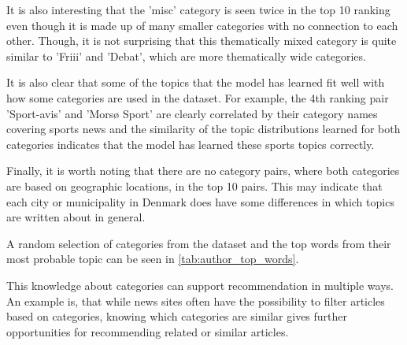 It is also interesting that the 'misc' category is seen twice in the top 10 ranking even though it is made up of many smaller categories with no connection to each other.
Though, it is not surprising that this thematically mixed category is quite similar to 'Friii' and 'Debat', which are more thematically wide categories.

It is also clear that some of the topics that the model has learned fit well with how some categories are used in the dataset.
For example, the 4th ranking pair 'Sport-avis' and 'Morsø Sport' are clearly correlated by their category names covering sports news and the similarity of the topic distributions learned for both categories indicates that the model has learned these sports topics correctly.

Finally, it is worth noting that there are no category pairs, where both categories are based on geographic locations, in the top 10 pairs.
This may indicate that each city or municipality in Denmark does have some differences in which topics are written about in general.

A random selection of categories from the dataset and the top words from their most probable topic can be seen in \autoref{tab:author_top_words}.

This knowledge about categories can support recommendation in multiple ways.
An example is, that while news sites often have the possibility to filter articles based on categories, knowing which categories are similar gives further opportunities for recommending related or similar articles.
